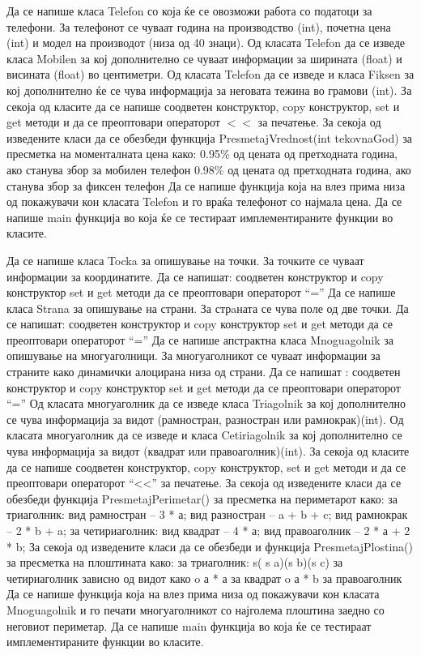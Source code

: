 \documentclass[12pt,a4paper]{exam}
\begin{document}
\begin{questions}
\begin{question}
Да се напише класа Telefon со која ќе се овозможи работа со податоци за
телефони. За телефонот се чуваат година на производство (int), почетна цена (int) и
модел на производот (низа од 40 знаци).
Од класата Telefon да се изведе класа Mobilen за кој дополнително се чуваат
информации за ширината (float) и висината (float) во центиметри.
Од класата Telefon да се изведе и класа Fiksen за кој дополнително ќе се чува
информација за неговата тежина во грамови (int).
За секоја од класите да се напише соодветен конструктор, copy конструктор, set и get
методи и да се преоптовари операторот $<<$ за печатење.
За секоја од изведените класи да се обезбеди функција PresmetajVrednost(int
tekovnaGod) за пресметка на моменталната цена како:
0.95\% од цената од претходната година, ако станува збор за мобилен телефон
0.98\% од цената од претходната година, ако станува збор за фиксен телефон
Да се напише функција која на влез прима низа од покажувачи кон класата Telefon и го
враќа телефонот со најмала цена.
Да се напише main функција во која ќе се тестираат имплементираните функции во
класите.

\question
Да се напише класа Tocka за опишување на точки. За точките се чуваат информации
за координатите. Да се напишат:
соодветен конструктор и copy конструктор
set и get методи
да се преоптовари операторот “=”
Да се напише класа Strana за опишување на страни. За стрaната се чува поле од две
точки. Да се напишат:
соодветен конструктор и copy конструктор
set и get методи
да се преоптовари операторот “=”
Да се напише апстрактна класа Mnoguagolnik за опишување на многуаголници. За
многуаголникот се чуваат информации за страните како динамички алоцирана низа од
страни. Да се напишат :
соодветен конструктор и copy конструктор
set и get методи
да се преоптовари операторот “=”
Од класата многуаголник да се изведе класа Triagolnik за кој дополнително се чува
информација за видот (рамностран, разностран или рамнокрак)(int).
Од класата многуаголник да се изведе и класа Cetiriagolnik за кој дополнително се чува
информација за видот (квадрат или правоаголник)(int).
За секоја од класите да се напише соодветен конструктор, copy конструктор, set и get
методи и да се преоптовари операторот “<<” за печатење.
За секоја од изведените класи да се обезбеди функција PresmetajPerimetar() за
пресметка на периметарот како:
за триаголник:
вид рамностран – 3 * а;
вид разностран – a + b + c;
вид рамнокрак – 2 * b + a;
за четириаголник:
вид квадрат – 4 * а;
вид правоаголник – 2 * а + 2 * b;
За секоја од изведените класи да се обезбеди и функција PresmetajPlostina() за
пресметка на плоштината како:
за триаголник: s( s a)(s b)(s c)
за четириаголник зависно од видот како
o а * а за квадрат
o а * b за правоаголник
Да се напише функција која на влез прима низа од покажувачи кон класата
Mnoguagolnik и го печати многуаголникот со најголема плоштина заедно со неговиот
периметар.
Да се напише main функција во која ќе се тестираат имплементираните функции во
класите.


\end{question}

\end{questions}
\end{document}
